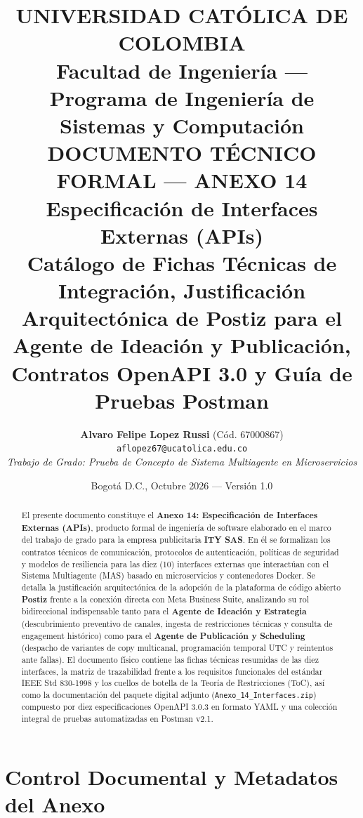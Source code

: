 \documentclass[11pt,a4paper]{article}
\title{
  \vspace{-1.5cm}
  \textbf{UNIVERSIDAD CATÓLICA DE COLOMBIA}\\[0.3em]
  \large Facultad de Ingeniería --- Programa de Ingeniería de Sistemas y Computación\\[1.5em]
  \Large \textbf{DOCUMENTO TÉCNICO FORMAL --- ANEXO 14}\\[0.5em]
  \huge \textbf{Especificación de Interfaces Externas (APIs)}\\[0.8em]
  \large Catálogo de Fichas Técnicas de Integración, Justificación Arquitectónica de Postiz para el Agente de Ideación y Publicación, Contratos OpenAPI 3.0 y Guía de Pruebas Postman
}
\author{\textbf{Alvaro Felipe Lopez Russi} (Cód. 67000867) \\ \texttt{aflopez67@ucatolica.edu.co} \\[0.5em] \textit{Trabajo de Grado: Prueba de Concepto de Sistema Multiagente en Microservicios}}
\date{Bogotá D.C., Octubre 2026 --- Versión 1.0}
\begin{document}
\maketitle

\begin{abstract}
\noindent El presente documento constituye el \textbf{Anexo 14: Especificación de Interfaces Externas (APIs)}, producto formal de ingeniería de software elaborado en el marco del trabajo de grado para la empresa publicitaria \textbf{ITY SAS}. En él se formalizan los contratos técnicos de comunicación, protocolos de autenticación, políticas de seguridad y modelos de resiliencia para las diez (10) interfaces externas que interactúan con el Sistema Multiagente (MAS) basado en microservicios y contenedores Docker. Se detalla la justificación arquitectónica de la adopción de la plataforma de código abierto \textbf{Postiz} frente a la conexión directa con Meta Business Suite, analizando su rol bidireccional indispensable tanto para el \textbf{Agente de Ideación y Estrategia} (descubrimiento preventivo de canales, ingesta de restricciones técnicas y consulta de engagement histórico) como para el \textbf{Agente de Publicación y Scheduling} (despacho de variantes de copy multicanal, programación temporal UTC y reintentos ante fallas). El documento físico contiene las fichas técnicas resumidas de las diez interfaces, la matriz de trazabilidad frente a los requisitos funcionales del estándar IEEE Std 830-1998 y los cuellos de botella de la Teoría de Restricciones (ToC), así como la documentación del paquete digital adjunto (\texttt{Anexo\_14\_Interfaces.zip}) compuesto por diez especificaciones OpenAPI 3.0.3 en formato YAML y una colección integral de pruebas automatizadas en Postman v2.1.
\end{abstract}

\tableofcontents
\newpage

\section{Control Documental y Metadatos del Anexo}\label{sec:metadatos}
\end{document}
